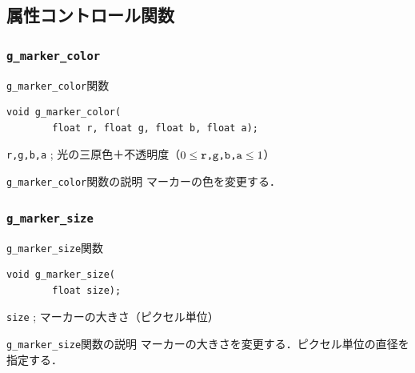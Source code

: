 \documentclass[platex,a4paper,12pt]{jsarticle}%
\begin{document}
\clearpage
\subsection{属性コントロール関数}

\subsubsection{\texttt{g\_marker\_color}}

\begin{itembox}[l]{\texttt{g\_marker\_color}関数}
\begin{verbatim}
void g_marker_color(
        float r, float g, float b, float a);
\end{verbatim}
\verb|r,g,b,a| ; 光の三原色＋不透明度（$0\leq \verb|r,g,b,a| \leq 1$）
\end{itembox}

\begin{itembox}[l]{\texttt{g\_marker\_color}関数の説明}
マーカーの色を変更する．
\end{itembox}

\subsubsection{\texttt{g\_marker\_size}}

\begin{itembox}[l]{\texttt{g\_marker\_size}関数}
\begin{verbatim}
void g_marker_size(
        float size);
\end{verbatim}
\verb|size| ; マーカーの大きさ（ピクセル単位）
\end{itembox}

\begin{itembox}[l]{\texttt{g\_marker\_size}関数の説明}
マーカーの大きさを変更する．ピクセル単位の直径を指定する．
\end{itembox}

\end{document}
